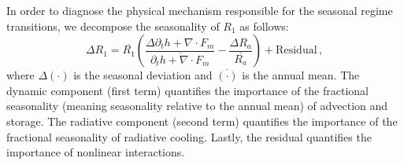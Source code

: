 \documentclass{ametsocV5}
\begin{document}
    In order to diagnose the physical mechanism responsible for the seasonal regime transitions, we decompose the seasonality of $R_1$ as follows:
    \begin{equation}\label{eq:r1-dev}
      \Delta R_1 = \overline{R_1}\left( \frac{\Delta\partial_t h + \nabla\cdot F_m}{\overline{\partial_t h + \nabla\cdot F_m}}  - \frac{\Delta R_a }{\overline{R_a}}\right) + \mathrm{Residual} \, ,
    \end{equation}
    where $\Delta(\cdot)$ is the seasonal deviation and $\overline{(\cdot)}$ is the annual mean. The dynamic component (first term) quantifies the importance of the fractional seasonality (meaning seasonality relative to the annual mean) of advection and storage. The radiative component (second term) quantifies the importance of the fractional seasonality of radiative cooling. Lastly, the residual quantifies the importance of nonlinear interactions.
\end{document}
